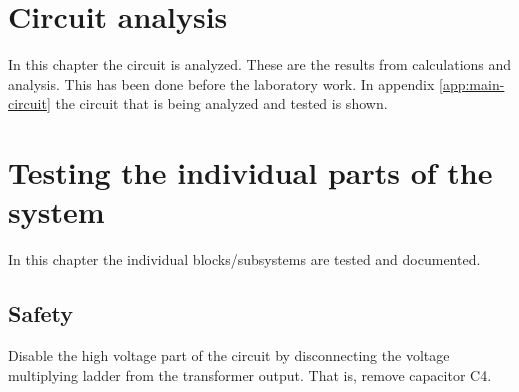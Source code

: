\documentclass{article}
\begin{document}




\newpage				%
\renewcommand{\contentsname}{Table of Contents}

\tableofcontents		%


\newpage
\section{Circuit analysis}
In this chapter the circuit is analyzed. These are the results from calculations and analysis. This has been done before the laboratory work. In appendix \ref{app:main-circuit} the circuit that is being analyzed and tested is shown.








\newpage
\section{Testing the individual parts of the system}
In this chapter the individual blocks/subsystems are tested and documented.

\subsection{Safety}
Disable the high voltage part of the circuit by disconnecting the voltage multiplying ladder from the transformer output. That is, remove capacitor C4.
\end{document}
